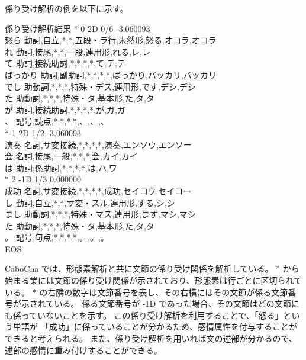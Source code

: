 \documentclass[11pt,a4j]{jsarticle}
\begin{document}
係り受け解析の例を以下に示す。

\begin{itembox}[l]{係り受け解析結果}
  * 0 2D 0/6 -3.060093 \\
  怒ら  動詞,自立,*,*,五段・ラ行,未然形,怒る,オコラ,オコラ \\
  れ  動詞,接尾,*,*,一段,連用形,れる,レ,レ\\
  て  助詞,接続助詞,*,*,*,*,て,テ,テ\\
  ばっかり  助詞,副助詞,*,*,*,*,ばっかり,バッカリ,バッカリ\\
  でし  助動詞,*,*,*,特殊・デス,連用形,です,デシ,デシ\\
  た  助動詞,*,*,*,特殊・タ,基本形,た,タ,タ\\
  が  助詞,接続助詞,*,*,*,*,が,ガ,ガ\\
  、  記号,読点,*,*,*,*,、,、,、\\
  * 1 2D 1/2 -3.060093\\
  演奏  名詞,サ変接続,*,*,*,*,演奏,エンソウ,エンソー\\
  会  名詞,接尾,一般,*,*,*,会,カイ,カイ\\
  は  助詞,係助詞,*,*,*,*,は,ハ,ワ\\
  * 2 -1D 1/3 0.000000\\
  成功  名詞,サ変接続,*,*,*,*,成功,セイコウ,セイコー\\
  し  動詞,自立,*,*,サ変・スル,連用形,する,シ,シ\\
  まし  助動詞,*,*,*,特殊・マス,連用形,ます,マシ,マシ\\
  た  助動詞,*,*,*,特殊・タ,基本形,た,タ,タ\\
  。  記号,句点,*,*,*,*,。,。,。\\
  EOS
\end{itembox}

CaboCha では、形態素解析と共に文節の係り受け関係を解析している。
* から始まる業には文節の係り受け関係が示されており、形態素は行ごとに区切られている。
* の右隣の数字は文節番号を表し、その右横にはその文節が係る文節番号が示されている。
係る文節番号が -1D であった場合、その文節はどの文節にも係っていないことを示す。
この係り受け解析を利用することで、「怒る」という単語が 「成功」に係っていることが分かるため、感情属性を付与することができると考えられる。
また、係り受け解析を用いれば文の述部が分かるので、述部の感情に重み付けすることができる。
\end{document}
